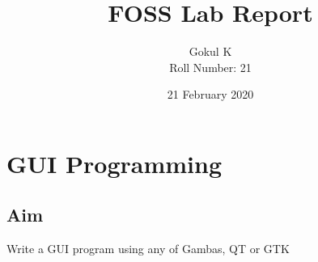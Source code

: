 \documentclass{article}
\begin{document}
\title{FOSS Lab Report}
\author{Gokul K\\[2\baselineskip]
Roll Number: 21\\[2\baselineskip]}
\date{21 February 2020}

\maketitle

\setcounter{section}{23}
\section{GUI Programming}
\subsection{Aim}
Write a GUI program using any of Gambas, QT or GTK
\end{document}
